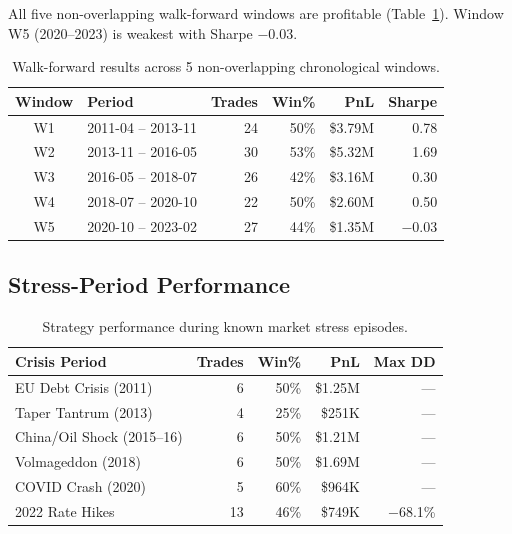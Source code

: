 \documentclass[11pt,a4paper]{article}
\begin{document}
All five non-overlapping walk-forward windows are profitable (Table~\ref{tab:walkforward}).
Window W5 (2020--2023) is weakest with Sharpe $-$0.03.

\begin{table}[H]
\centering
\caption{Walk-forward results across 5 non-overlapping chronological windows.}
\label{tab:walkforward}
\begin{tabular}{@{}clrrrr@{}}
\toprule
\textbf{Window} & \textbf{Period} & \textbf{Trades} & \textbf{Win\%} & \textbf{PnL} & \textbf{Sharpe} \\
\midrule
W1 & 2011-04 -- 2013-11 & 24 & 50\% & \$3.79M & 0.78 \\
W2 & 2013-11 -- 2016-05 & 30 & 53\% & \$5.32M & 1.69 \\
W3 & 2016-05 -- 2018-07 & 26 & 42\% & \$3.16M & 0.30 \\
W4 & 2018-07 -- 2020-10 & 22 & 50\% & \$2.60M & 0.50 \\
W5 & 2020-10 -- 2023-02 & 27 & 44\% & \$1.35M & $-$0.03 \\
\bottomrule
\end{tabular}
\end{table}


\subsection{Stress-Period Performance}

\begin{table}[H]
\centering
\caption{Strategy performance during known market stress episodes.}
\label{tab:stress}
\begin{tabular}{@{}lrrrr@{}}
\toprule
\textbf{Crisis Period} & \textbf{Trades} & \textbf{Win\%} & \textbf{PnL} & \textbf{Max DD} \\
\midrule
EU Debt Crisis (2011)      & 6  & 50\% & \$1.25M  & --- \\
Taper Tantrum (2013)       & 4  & 25\% & \$251K   & --- \\
China/Oil Shock (2015--16) & 6  & 50\% & \$1.21M  & --- \\
Volmageddon (2018)         & 6  & 50\% & \$1.69M  & --- \\
COVID Crash (2020)         & 5  & 60\% & \$964K   & --- \\
2022 Rate Hikes            & 13 & 46\% & \$749K   & $-$68.1\% \\
\bottomrule
\end{tabular}
\end{table}
\end{document}
